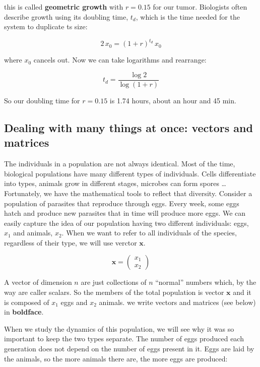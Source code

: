 \documentclass[12pt]{article}
\begin{document}
this is called \textbf{geometric growth} with $r=0.15$ for our tumor. Biologists often describe growth using its doubling time, $t_d$,  which is the time needed for the system to duplicate ts size:

\begin{equation}
2\, x_{0} = (1 + r)^{t_d} \, x_0
\end{equation}

where $x_0$ cancels out. Now we can take  logarithms and rearrange:

\begin{equation}
t_d = \frac{\log 2}{\log (1 + r) }
\end{equation}

So our doubling time for $r=0.15$ is 1.74 hours, about an hour and 45 min.

\subsection{Dealing with many things at once: vectors and matrices}

The  individuals in a population are not always identical. Most of the time, biological populations have many different types of individuals. Cells differentiate into types, animals grow in different stages, microbes can form spores \dots Fortunately, we have the mathematical tools to reflect that diversity. Consider a population of parasites that reproduce through eggs. Every week, some eggs hatch and produce new parasites that in time will produce more eggs. We can easily capture the idea of our population having two different individuals: eggs, $x_1$ and animals, $x_2$. When we want to refer to all individuals of the species, regardless of their type, we will use verctor $\mathbf{x}$.

\begin{equation}
\mathbf{x} =\left( \begin{array}{c} x_1 \\  x_2 \end{array} \right)
\end{equation}

A vector of dimension $n$ are just collections of $n$ ``normal'' numbers which, by the way are caller scalars. So the members of the total population is vector  $\mathbf{x}$ and it is composed of $x_1$ eggs and $x_2$ animals. we write vectors and matrices (see below) in \textbf{boldface}.


When we study the dynamics of this population, we will see why it was so important to keep the two types separate. The number of eggs produced each generation does not depend on the number of eggs present in it. Eggs are laid by the animals, so the more animals there are, the more eggs are produced:
\end{document}

